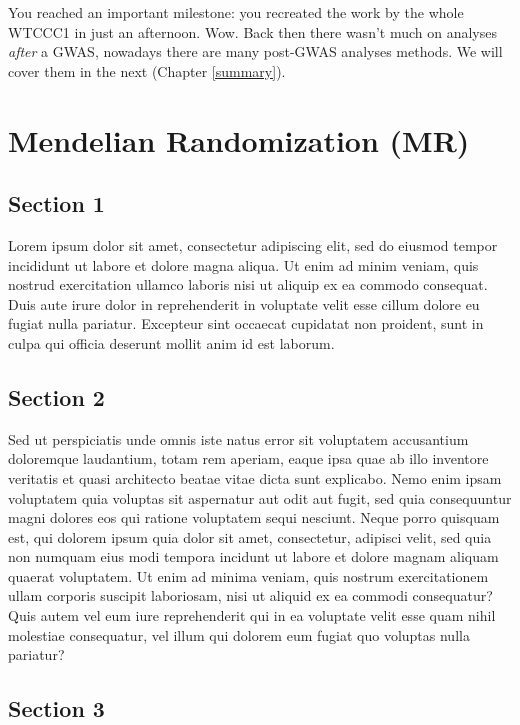 \documentclass[
]{book}
\begin{document}
You reached an important milestone: you recreated the work by the whole WTCCC1 in just an afternoon. Wow. Back then there wasn't much on analyses \emph{after} a GWAS, nowadays there are many post-GWAS analyses methods. We will cover them in the next (Chapter \ref{summary}).

\hypertarget{mendelian-randomization-mr-1}{%
\chapter{Mendelian Randomization (MR)}\label{mendelian-randomization-mr-1}}

\hypertarget{section-1-4}{%
\section{Section 1}\label{section-1-4}}

Lorem ipsum dolor sit amet, consectetur adipiscing elit, sed do eiusmod tempor incididunt ut labore et dolore magna aliqua. Ut enim ad minim veniam, quis nostrud exercitation ullamco laboris nisi ut aliquip ex ea commodo consequat. Duis aute irure dolor in reprehenderit in voluptate velit esse cillum dolore eu fugiat nulla pariatur. Excepteur sint occaecat cupidatat non proident, sunt in culpa qui officia deserunt mollit anim id est laborum.

\hypertarget{section-2-4}{%
\section{Section 2}\label{section-2-4}}

Sed ut perspiciatis unde omnis iste natus error sit voluptatem accusantium doloremque laudantium, totam rem aperiam, eaque ipsa quae ab illo inventore veritatis et quasi architecto beatae vitae dicta sunt explicabo. Nemo enim ipsam voluptatem quia voluptas sit aspernatur aut odit aut fugit, sed quia consequuntur magni dolores eos qui ratione voluptatem sequi nesciunt. Neque porro quisquam est, qui dolorem ipsum quia dolor sit amet, consectetur, adipisci velit, sed quia non numquam eius modi tempora incidunt ut labore et dolore magnam aliquam quaerat voluptatem. Ut enim ad minima veniam, quis nostrum exercitationem ullam corporis suscipit laboriosam, nisi ut aliquid ex ea commodi consequatur? Quis autem vel eum iure reprehenderit qui in ea voluptate velit esse quam nihil molestiae consequatur, vel illum qui dolorem eum fugiat quo voluptas nulla pariatur?

\hypertarget{section-3-4}{%
\section{Section 3}\label{section-3-4}}
\end{document}
